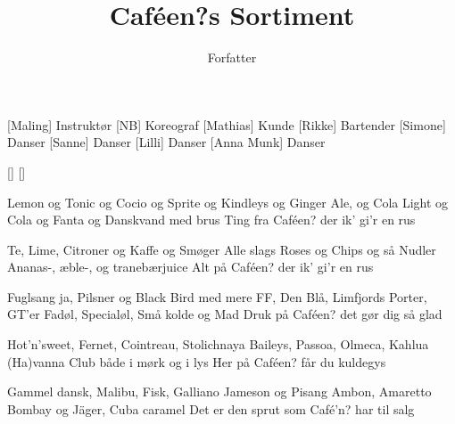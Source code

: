 \documentclass[a4paper,11pt]{article}
\title{Caféen?s Sortiment}
\author{Forfatter}
\begin{document}
\maketitle

\begin{roles}
[Maling] Instruktør
[NB] Koreograf
[Mathias] Kunde
[Rikke] Bartender
[Simone] Danser
[Sanne] Danser
[Lilli] Danser
[Anna Munk] Danser
\end{roles}

\begin{props}
[]
[]
\end{props}

\begin{song}

 Lemon og Tonic og Cocio og Sprite og
Kindleys og Ginger Ale, og Cola Light og
Cola og Fanta og Danskvand med brus
Ting fra Caféen? der ik' gi'r en rus

Te, Lime, Citroner og Kaffe og Smøger
Alle slags Roses og Chips og så Nudler
Ananas-, æble-, og tranebærjuice
Alt på Caféen? der ik' gi'r en rus

Fuglsang ja, Pilsner og Black Bird med mere
FF, Den Blå, Limfjords Porter, GT'er
Fadøl, Specialøl, Små kolde og Mad
Druk på Caféen? det gør dig så glad

Hot'n'sweet, Fernet, Cointreau, Stolichnaya
Baileys, Passoa, Olmeca, Kahlua
(Ha)vanna Club både i mørk og i lys
Her på Caféen? får du kuldegys

Gammel dansk, Malibu, Fisk, Galliano
Jameson og Pisang Ambon, Amaretto
Bombay og Jäger, Cuba caramel
Det er den sprut som Café'n? har til salg
\end{song}
\end{document}
